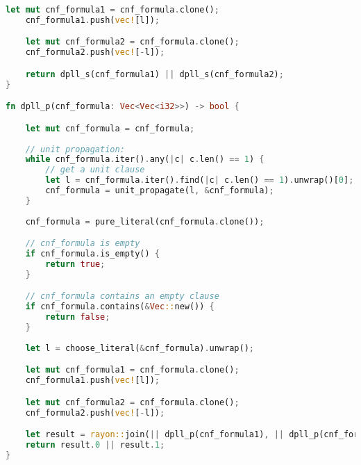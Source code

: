 \documentclass[conference]{IEEEtran}
\begin{document}
\begin{lstlisting}[label={lst:rust},language=Rust]
    let mut cnf_formula1 = cnf_formula.clone(); 
    cnf_formula1.push(vec![l]);

    let mut cnf_formula2 = cnf_formula.clone(); 
    cnf_formula2.push(vec![-l]); 

    return dpll_s(cnf_formula1) || dpll_s(cnf_formula2);
}

fn dpll_p(cnf_formula: Vec<Vec<i32>>) -> bool {

    let mut cnf_formula = cnf_formula; 
    
    // unit propagation:
    while cnf_formula.iter().any(|c| c.len() == 1) {
        // get a unit clause
        let l = cnf_formula.iter().find(|c| c.len() == 1).unwrap()[0]; 
        cnf_formula = unit_propagate(l, &cnf_formula);
    }
    
    cnf_formula = pure_literal(cnf_formula.clone());

    // cnf_formula is empty
    if cnf_formula.is_empty() {
        return true;
    }

    // cnf_formula contains an empty clause
    if cnf_formula.contains(&Vec::new()) {
        return false;
    }
    
    let l = choose_literal(&cnf_formula).unwrap(); 

    let mut cnf_formula1 = cnf_formula.clone(); 
    cnf_formula1.push(vec![l]);

    let mut cnf_formula2 = cnf_formula.clone(); 
    cnf_formula2.push(vec![-l]); 

    let result = rayon::join(|| dpll_p(cnf_formula1), || dpll_p(cnf_formula2));
    return result.0 || result.1;
}
\end{lstlisting}
\end{document}
